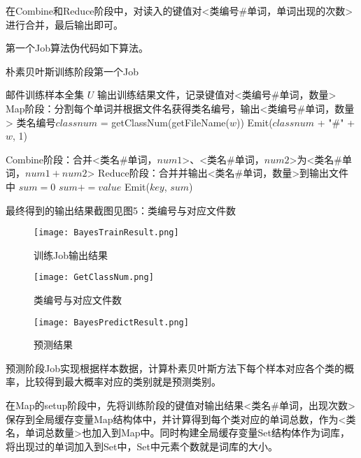\documentclass[lang=cn,11pt]{elegantpaper}
\begin{document}
在Combine和Reduce阶段中，对读入的键值对<类编号\#单词，单词出现的次数>进行合并，最后输出即可。

第一个Job算法伪代码如下算法。

\begin{algorithm}[!htb]
  \caption{朴素贝叶斯训练阶段第一个Job}
  \label{alg:Framwork}
  \begin{algorithmic}[1]
    \Require
    邮件训练样本全集 $U$
    \Ensure
    输出训练结果文件，记录键值对<类编号\#单词，数量>
    \State Map阶段：分割每个单词并根据文件名获得类名编号，输出<类编号\#单词，数量>
        \State 类名编号$classnum$ = getClassNum(getFileName($w$))
        \State Emit($classnum$ + "\#" + $w$, 1)
      \EndFor
   \EndFunction

	\State Combine阶段：合并<类名\#单词，$num1$>、<类名\#单词，$num2$>为<类名\#单词，$num1+num2$>
  \State Reduce阶段：合并并输出<类名\#单词，数量>到输出文件中
    \State $sum = 0$
        \State $sum += value$
    \EndFor
    \State Emit($key$, $sum$)
  \EndFunction
  \end{algorithmic}
\end{algorithm}

最终得到的输出结果截图见图5：类编号与对应文件数


\begin{figure}[!htb]
  \begin{minipage}[t]{0.33\linewidth}
  \centering
  \texttt{[image: BayesTrainResult.png]}
  \caption{训练Job输出结果 \label{fig:BayesTrainResult}}
  \label{fig:side:a}
  \end{minipage}
  \begin{minipage}[t]{0.33\linewidth}
  \centering
  \texttt{[image: GetClassNum.png]}
  \caption{类编号与对应文件数 \label{fig:GetClassNum}}
  \label{fig:side:b}
  \end{minipage}
  \begin{minipage}[t]{0.33\linewidth}
  \centering
  \texttt{[image: BayesPredictResult.png]}
  \caption{预测结果 \label{fig:BayesPredictResult}}
  \label{fig:side:b}
  \end{minipage}
\end{figure}

预测阶段Job实现根据样本数据，计算朴素贝叶斯方法下每个样本对应各个类的概率，比较得到最大概率对应的类别就是预测类别。

在Map的setup阶段中，先将训练阶段的键值对输出结果<类名\#单词，出现次数>保存到全局缓存变量Map结构体中，并计算得到每个类对应的单词总数，作为<类名，单词总数量>也加入到Map中。同时构建全局缓存变量Set结构体作为词库，将出现过的单词加入到Set中，Set中元素个数就是词库的大小。
\end{document}
